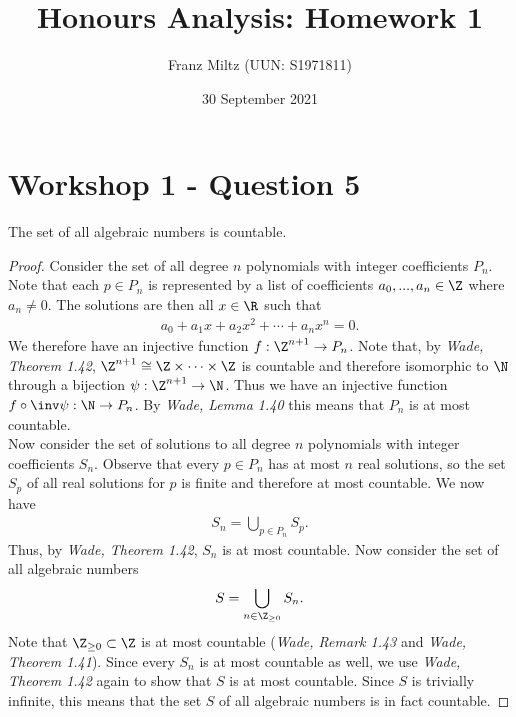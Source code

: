 \documentclass{article}
\begin{document}
\title{Honours Analysis: Homework 1}
\author{Franz Miltz (UUN: S1971811)}
\date{30 September 2021}
\maketitle

\section{Workshop 1 - Question 5}

\begin{claim}
	The set of all algebraic numbers is countable.
	\begin{proof}
		Consider the set of all degree $n$ polynomials with integer coefficients $P_n$.
		Note that each $p\in P_n$ is represented by a list of coefficients
		$a_0, ..., a_n\in\Z$ where $a_n\not=0$. The solutions are then all $x\in\R$
		such that
		\begin{align*}
			a_0 + a_1 x + a_2 x^2 + \cdots + a_n x^n = 0.
		\end{align*}
		We therefore have an injective function $f:\Z^{n+1}\to P_n$.
		Note that, by \emph{Wade, Theorem 1.42}, $\Z^{n+1}\cong \Z \times \cdots \times \Z$ is countable and therefore isomorphic to $\N$
		through a bijection $\psi:\Z^{n+1}\to\N$. Thus we have an injective
		function $f\circ\inv\psi:\N\to P_n$.
		By \emph{Wade, Lemma 1.40} this means that $P_n$ is at most countable.\\
		Now consider the set of solutions to all degree $n$ polynomials with
		integer coefficients $S_n$. Observe that every $p\in P_n$ has at most
		$n$ real solutions, so the set $S_p$ of all real solutions for $p$ is
		finite and therefore at most countable.
		We now have
		\begin{align*}
			S_n = \bigcup_{p\in P_n} S_p.
		\end{align*}
		Thus, by \emph{Wade, Theorem 1.42}, $S_n$ is at most countable.
		Now consider the set of all algebraic numbers
		\begin{align*}
			S = \bigcup_{n\in\Z_{\geq 0}}S_n.
		\end{align*}
		Note that $\Z_{\geq 0}\subset \Z$ is at most countable
		(\emph{Wade, Remark 1.43} and \emph{Wade, Theorem 1.41}). Since
		every $S_n$ is at most countable as well, we use \emph{Wade, Theorem 1.42}
		again to show that $S$ is at most countable.
		Since $S$ is trivially infinite, this means that the set $S$ of
		all algebraic numbers is in fact countable.
	\end{proof}
\end{claim}
\end{document}
